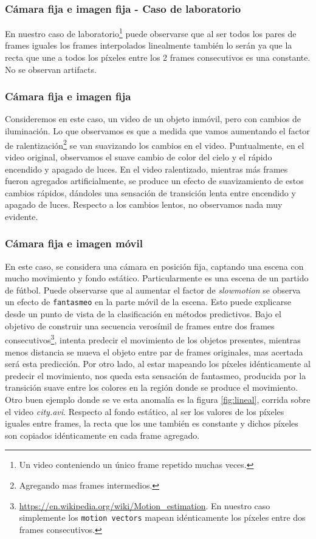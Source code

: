 \subsubsection*{Cámara fija e imagen fija - Caso de laboratorio}
En nuestro caso de laboratorio\footnote{Un video conteniendo un único frame repetido muchas veces.} puede observarse que al ser todos los pares de frames iguales los frames interpolados linealmente también lo serán ya que la recta que une a todos los píxeles entre los 2 frames consecutivos es una constante. No se observan artifacts.

\subsubsection*{Cámara fija e imagen fija}
Consideremos en este caso, un video de un objeto inmóvil, pero con cambios de iluminación. Lo que observamos es que a medida que vamos aumentando el factor de ralentización\footnote{Agregando mas frames intermedios.} se van suavizando los cambios en el video. Puntualmente, en el video original, observamos el suave cambio de color del cielo y el rápido encendido y apagado de luces. En el video ralentizado, mientras más frames fueron agregados artificialmente, se produce un efecto de suavizamiento de estos cambios rápidos, dándoles una sensación de transición lenta entre encendido y apagado de luces. Respecto a los cambios lentos, no observamos nada muy evidente.

\subsubsection*{Cámara fija e imagen móvil}
En este caso, se considera una cámara en posición fija, captando una escena con mucho movimiento y fondo estático. Particularmente es una escena de un partido de fútbol. Puede observarse que al aumentar el factor de \emph{slowmotion} se observa un efecto de \texttt{fantasmeo} en la parte móvil de la escena. Esto puede explicarse desde un punto de vista de la clasificación en métodos predictivos. Bajo el objetivo de construir una secuencia verosímil de frames entre dos frames consecutivos\footnote{\url{https://en.wikipedia.org/wiki/Motion_estimation}. En nuestro caso simplemente los \texttt{motion vectors} mapean idénticamente los píxeles entre dos frames consecutivos.}, intenta predecir el movimiento de los objetos presentes, mientras menos distancia se mueva el objeto entre par de frames originales, mas acertada será esta predicción. Por otro lado, al estar mapeando los píxeles idénticamente al predecir el movimiento, nos queda esta sensación de fantasmeo, producida por la transición suave entre los colores en la región donde se produce el movimiento. Otro buen ejemplo donde se ve esta anomalía es la figura \ref{fig:lineal}, corrida sobre el video \emph{city.avi}. Respecto al fondo estático, al ser los valores de los píxeles iguales entre frames, la recta que los une también es constante y dichos píxeles son copiados idénticamente en cada frame agregado.

